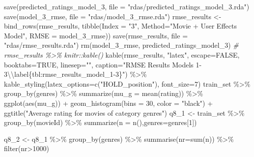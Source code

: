 \documentclass[
]{article}
\newenvironment{Shaded}{}{}
\newcommand{\AttributeTok}[1]{\textcolor[rgb]{0.49,0.56,0.16}{#1}}
\newcommand{\CommentTok}[1]{\textcolor[rgb]{0.38,0.63,0.69}{\textit{#1}}}
\newcommand{\ConstantTok}[1]{\textcolor[rgb]{0.53,0.00,0.00}{#1}}
\newcommand{\DecValTok}[1]{\textcolor[rgb]{0.25,0.63,0.44}{#1}}
\newcommand{\FunctionTok}[1]{\textcolor[rgb]{0.02,0.16,0.49}{#1}}
\newcommand{\NormalTok}[1]{#1}
\newcommand{\OtherTok}[1]{\textcolor[rgb]{0.00,0.44,0.13}{#1}}
\newcommand{\SpecialCharTok}[1]{\textcolor[rgb]{0.25,0.44,0.63}{#1}}
\newcommand{\StringTok}[1]{\textcolor[rgb]{0.25,0.44,0.63}{#1}}
\begin{document}
\begin{Shaded}
\begin{Highlighting}[]
\FunctionTok{save}\NormalTok{(predicted\_ratings\_model\_3, }\AttributeTok{file =} \StringTok{"rdas/predicted\_ratings\_model\_3.rda"}\NormalTok{)}
\FunctionTok{save}\NormalTok{(model\_3\_rmse, }\AttributeTok{file =} \StringTok{"rdas/model\_3\_rmse.rda"}\NormalTok{)}
\NormalTok{rmse\_results }\OtherTok{\textless{}{-}} \FunctionTok{bind\_rows}\NormalTok{(rmse\_results,}
                          \FunctionTok{tibble}\NormalTok{(}\AttributeTok{Index =} \StringTok{"3"}\NormalTok{, }\AttributeTok{Method=}\StringTok{"Movie + User Effects Model"}\NormalTok{,  }
                                 \AttributeTok{RMSE =}\NormalTok{ model\_3\_rmse))}
\FunctionTok{save}\NormalTok{(rmse\_results, }\AttributeTok{file =} \StringTok{"rdas/rmse\_results.rda"}\NormalTok{)}
\FunctionTok{rm}\NormalTok{(model\_3\_rmse, predicted\_ratings\_model\_3)}
\CommentTok{\# rmse\_results \%\textgreater{}\% knitr::kable()}
  \FunctionTok{kable}\NormalTok{(rmse\_results, }\StringTok{"latex"}\NormalTok{, }\AttributeTok{escape=}\ConstantTok{FALSE}\NormalTok{, }\AttributeTok{booktabs=}\ConstantTok{TRUE}\NormalTok{, }\AttributeTok{linesep=}\StringTok{""}\NormalTok{, }\AttributeTok{caption=}\StringTok{"RMSE Results Models 1{-}3}\SpecialCharTok{\textbackslash{}\textbackslash{}}\StringTok{label\{tbl:rmse\_results\_model\_1{-}3\}"}\NormalTok{) }\SpecialCharTok{\%\textgreater{}\%}
    \FunctionTok{kable\_styling}\NormalTok{(}\AttributeTok{latex\_options=}\FunctionTok{c}\NormalTok{(}\StringTok{"HOLD\_position"}\NormalTok{), }\AttributeTok{font\_size=}\DecValTok{7}\NormalTok{)}
\NormalTok{train\_set }\SpecialCharTok{\%\textgreater{}\%} 
  \FunctionTok{group\_by}\NormalTok{(genres) }\SpecialCharTok{\%\textgreater{}\%} 
  \FunctionTok{summarize}\NormalTok{(}\AttributeTok{mu\_g =} \FunctionTok{mean}\NormalTok{(rating)) }\SpecialCharTok{\%\textgreater{}\%} 
  \FunctionTok{ggplot}\NormalTok{(}\FunctionTok{aes}\NormalTok{(mu\_g)) }\SpecialCharTok{+} 
  \FunctionTok{geom\_histogram}\NormalTok{(}\AttributeTok{bins =} \DecValTok{30}\NormalTok{, }\AttributeTok{color =} \StringTok{"black"}\NormalTok{) }\SpecialCharTok{+} 
  \FunctionTok{ggtitle}\NormalTok{(}\StringTok{"Average rating for movies of category genres"}\NormalTok{)}
\NormalTok{q8\_1 }\OtherTok{\textless{}{-}}\NormalTok{ train\_set }\SpecialCharTok{\%\textgreater{}\%} 
  \FunctionTok{group\_by}\NormalTok{(movieId) }\SpecialCharTok{\%\textgreater{}\%}
  \FunctionTok{summarize}\NormalTok{(}\AttributeTok{n =} \FunctionTok{n}\NormalTok{(),}\AttributeTok{genres=}\NormalTok{genres[}\DecValTok{1}\NormalTok{])}

\NormalTok{q8\_2 }\OtherTok{\textless{}{-}}\NormalTok{ q8\_1 }\SpecialCharTok{\%\textgreater{}\%} \FunctionTok{group\_by}\NormalTok{(genres) }\SpecialCharTok{\%\textgreater{}\%} 
  \FunctionTok{summarise}\NormalTok{(}\AttributeTok{nr=}\FunctionTok{sum}\NormalTok{(n)) }\SpecialCharTok{\%\textgreater{}\%} 
  \FunctionTok{filter}\NormalTok{(nr}\SpecialCharTok{\textgreater{}}\DecValTok{1000}\NormalTok{) }


\end{Highlighting}
\end{Shaded}
\end{document}

